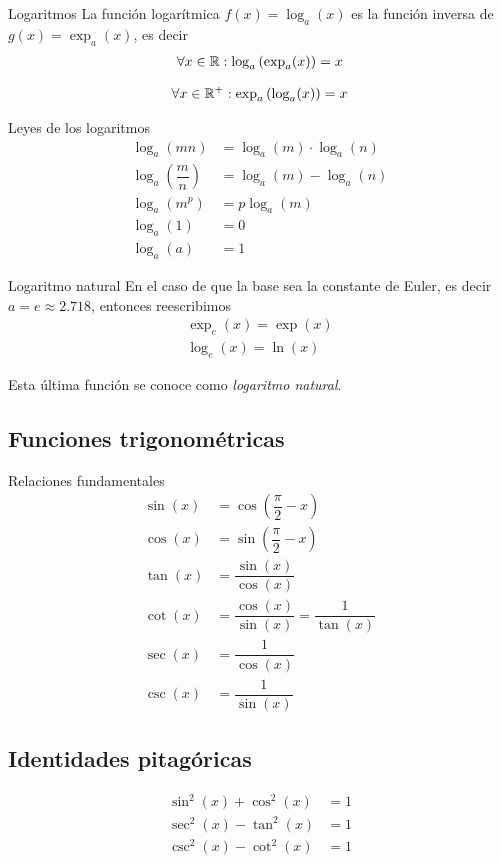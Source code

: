 {Logaritmos}
  La función logarítmica $f(x)=\log_{a}(x)$ es la función inversa de $g(x) = \exp_{a}(x)$, 
   es decir 
       \begin{align}
    \forall x \in \mathbb{R}: \log_{a}\left( \exp_{a}(x) \right) = x
    \end{align}
    
         \begin{align}
     \forall x \in \mathbb{R}^{+}: \exp_{a}\left( \log_{a}(x) \right) = x
     \end{align}

{Leyes de los logaritmos}
     \begin{align}
   \log_{a}(mn)&= \log_{a}(m)\cdot \log_{a}(n) \\
   \log_{a}\left( \dfrac{m}{n} \right)&= \log_{a}(m)-\log_{a}(n) \\ 
   \log_{a}(m^{p}) &= p\log_{a}(m) \\ 
   \log_{a}(1)&= 0\\ 
   \log_{a}(a)&=1
   \end{align}

{Logaritmo natural}
  En el caso de que la base sea la constante de Euler, es decir $a=e\approx 2.718$, entonces reescribimos
     \begin{align}
   \exp_{e}(x)=\exp(x)\\ 
   \log_{e}(x)=\ln(x)
   \end{align}
   
   Esta última función se conoce como \emph{logaritmo natural}.

\subsection{Funciones trigonométricas}
{Relaciones fundamentales}
\begin{align}
\sin(x) &=\cos\left( \dfrac{\pi}{2}-x \right) \\    
\cos(x) &= \sin\left( \dfrac{\pi}{2}-x \right) \\    
\tan(x) &= \dfrac{\sin(x)}{\cos(x)} \\     
\cot(x) &= \dfrac{\cos(x)}{\sin(x)}=\dfrac{1}{\tan(x)} \\    
\sec(x) &= \dfrac{1}{\cos(x)} \\    
\csc(x) &= \dfrac{1}{\sin(x)}
\end{align}

\subsection{Identidades pitagóricas}
\begin{align}
\sin^{2}(x)+\cos^{2}(x)&= 1\\ 
\sec^{2}(x)-\tan^{2}(x)&= 1\\ 
\csc^{2}(x)-\cot^{2}(x)&= 1
\end{align}

